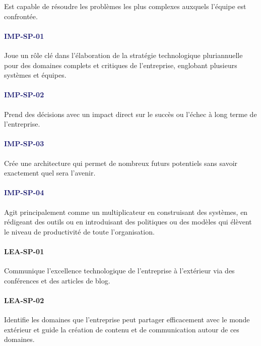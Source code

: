\documentclass[a4paper, french, openany, 12pt]{book}
\newcommand\wis[1]{\textcolor{MidnightBlue}{\textbf{\uppercase{imp-{#1}}}}}
\newcommand\cha[1]{\textcolor{OliveGreen}{\textbf{\uppercase{lea-{#1}}}}}
\begin{document}
\begin{multicols}{2}
  Est capable de résoudre les problèmes les plus complexes auxquels l'équipe est confrontée.

  \paragraph*{\wis{sp-01}}

  Joue un rôle clé dans l'élaboration de la stratégie technologique pluriannuelle pour des domaines complets et critiques 
  de l'entreprise, englobant plusieurs systèmes et équipes.

  \paragraph*{\wis{sp-02}}

  Prend des décisions avec un impact direct sur le succès ou l'échec à long terme de l'entreprise.
  
  \paragraph*{\wis{sp-03}}

  Crée une architecture qui permet de nombreux futurs potentiels sans savoir exactement quel sera l'avenir.

  \paragraph*{\wis{sp-04}}

  Agit principalement comme un multiplicateur en construisant des systèmes, en rédigeant des outils ou en introduisant 
  des politiques ou des modèles qui élèvent le niveau de productivité de toute l'organisation.

  \paragraph*{\cha{sp-01}}

  Communique l'excellence technologique de l'entreprise à l'extérieur via des conférences et des articles de blog. 
  
  \paragraph*{\cha{sp-02}}

  Identifie les domaines que l'entreprise peut partager efficacement avec le monde extérieur et guide la création de 
  contenu et de communication autour de ces domaines.


\end{multicols}
\end{document}
